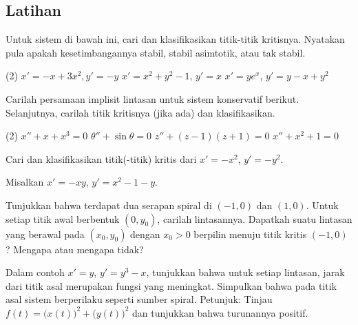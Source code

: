 \subsection{Latihan}

\begin{exercise}
Untuk sistem di bawah ini, cari dan klasifikasikan titik-titik kritisnya.
Nyatakan pula
apakah kesetimbangannya stabil, stabil asimtotik, atau tak stabil.
\begin{tasks}(2)
\task $x'=-x+3x^2, y'=-y$
\task $x'=x^2+y^2-1$, $y'=x$
\task $x'=ye^x$, $y'=y-x+y^2$
\end{tasks}
\end{exercise}

\begin{exercise}
\pagebreak[2]
Carilah persamaan implisit lintasan untuk sistem konservatif
berikut. Selanjutnya, carilah titik kritisnya (jika ada) dan klasifikasikan.
\begin{tasks}(2)
\task $x''+ x+x^3 = 0$
\task $\theta''+\sin \theta = 0$
\task $z''+ (z-1)(z+1) = 0$
\task $x''+ x^2+1 = 0$
\end{tasks}
\end{exercise}

\begin{exercise}
Cari dan klasifikasikan titik(-titik) kritis dari $x' = -x^2$, $y' = -y^2$.
\end{exercise}

\begin{samepage}
\begin{exercise}
Misalkan $x'=-xy$, $y'=x^2-1-y$.
\begin{tasks}
\task
Tunjukkan bahwa terdapat dua serapan spiral di
$(-1,0)$ dan $(1,0)$.
\task
Untuk setiap titik awal berbentuk $(0,y_0)$, carilah lintasannya.
\task
Dapatkah suatu lintasan yang berawal pada $(x_0,y_0)$ dengan $x_0 > 0$ berpilin menuju
titik kritis $(-1,0)$? Mengapa atau mengapa tidak?
\end{tasks}
\end{exercise}
\end{samepage}

\begin{exercise} \label{exercise:increasing}
Dalam contoh $x'=y$, $y'=y^3-x$,
tunjukkan bahwa untuk setiap lintasan, jarak
dari titik asal merupakan fungsi yang meningkat.
Simpulkan
bahwa pada titik asal sistem berperilaku seperti sumber spiral.
Petunjuk: Tinjau $f(t) =
{\bigl(x(t)\bigr)}^2 + 
{\bigl(y(t)\bigr)}^2$ dan tunjukkan bahwa turunannya positif.
\end{exercise}



